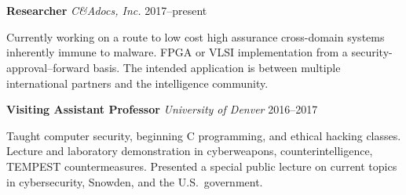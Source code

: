 \section*{}

\begin{comment}
\vspace{-10mm}
\emph{Technical programming, cybersecurity, certification and accreditation
of cross domain solutions and systems, cryptography, pentesting, security
research, writing and speaking. Specialist in understanding new government
computer security standards---especially when they're new or have
suddenly changed. Experienced in Common Criteria, DIACAP, NIST SP 800-53
and RMF, DCID 6/3, and DoD 8540.}
\end{comment}

\vspace{-10mm}
\begin{comment}
\noindent\textbf{Research Assistant Professor}
    \hfill\emph{University of Denver}\hfill 2017--present

    \vspace{1mm}
    \noindent Developing a transformational new method for high assurance cross-domain
    information transfer. FPGA implementation from a
    security-approval--forward basis. The intended application is
    between multiple international partners and intel community.
    Principal Investigator (PI) for the CCM project.

\vspace{3mm}
\end{comment}
\noindent\textbf{Researcher}
    \hfill\emph{C\&Adocs, Inc.} \hfill 2017--present

    \vspace{1mm}
    \noindent 
    Currently working on a route to low cost high assurance cross-domain systems
    inherently immune to malware. FPGA or VLSI implementation from a
    security-approval--forward basis. The intended application is between
    multiple international partners and the intelligence community.

\vspace{3mm}
\noindent\textbf{Visiting Assistant Professor}
    \hfill \emph{University of Denver} \hfill 2016--2017

    \vspace{1mm}
    \noindent Taught computer security, beginning C programming, and ethical hacking
    classes. Lecture and laboratory demonstration in cyberweapons,
    counterintelligence, TEMPEST countermeasures. Presented a special public lecture on
    current topics in cybersecurity, Snowden, and the U.S.\ government.

